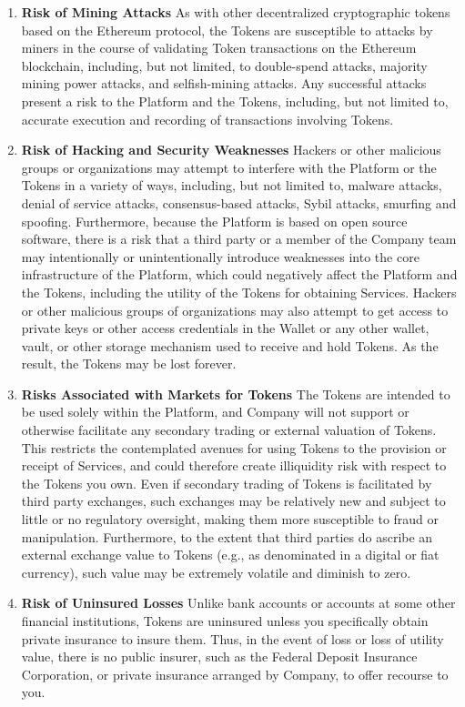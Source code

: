 \begin{enumerate}
    \item \textbf{Risk of Mining Attacks}
    As with other decentralized cryptographic tokens based on the Ethereum protocol, the Tokens are susceptible to attacks by miners in the course of validating Token transactions on the Ethereum blockchain, including, but not limited, to double-spend attacks, majority mining power attacks, and selfish-mining attacks. Any successful attacks present a risk to the Platform and the Tokens, including, but not limited to, accurate execution and recording of transactions involving Tokens.
    
    \item \textbf{Risk of Hacking and Security Weaknesses}
    Hackers or other malicious groups or organizations may attempt to interfere with the Platform or the Tokens in a variety of ways, including, but not limited to, malware attacks, denial of service attacks, consensus-based attacks, Sybil attacks, smurfing and spoofing. Furthermore, because the Platform is based on open source software, there is a risk that a third party or a member of the Company team may intentionally or unintentionally introduce weaknesses into the core infrastructure of the Platform, which could negatively affect the Platform and the Tokens, including the utility of the Tokens for obtaining Services. Hackers or other malicious groups of organizations may also attempt to get access to private keys or other access credentials in the Wallet or any other wallet, vault, or other storage mechanism used to receive and hold Tokens. As the result, the Tokens may be lost forever.
     
    \item \textbf{Risks Associated with Markets for Tokens}
    The Tokens are intended to be used solely within the Platform, and Company will not support or otherwise facilitate any secondary trading or external valuation of Tokens. This restricts the contemplated avenues for using Tokens to the provision or receipt of Services, and could therefore create illiquidity risk with respect to the Tokens you own. Even if secondary trading of Tokens is facilitated by third party exchanges, such exchanges may be relatively new and subject to little or no regulatory oversight, making them more susceptible to fraud or manipulation. Furthermore, to the extent that third parties do ascribe an external exchange value to Tokens (e.g., as denominated in a digital or fiat currency), such value may be extremely volatile and diminish to zero.
    
    \item \textbf{Risk of Uninsured Losses}
    Unlike bank accounts or accounts at some other financial institutions, Tokens are uninsured unless you specifically obtain private insurance to insure them. Thus, in the event of loss or loss of utility value, there is no public insurer, such as the Federal Deposit Insurance Corporation, or private insurance arranged by Company, to offer recourse to you.
    

\end{enumerate}
